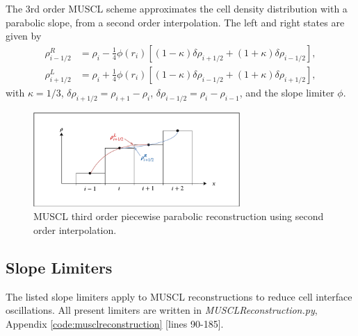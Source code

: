 	The 3rd order MUSCL scheme approximates the cell density distribution with a parabolic slope, from a second order interpolation. The left and right states are given by
	\begin{align}
		\rho^{R}_{i-1/2}&=\rho_{i}-\frac{1}{4}\phi\left(r_{i}\right)\left[\left(1-\kappa\right)\delta\rho_{i+1/2}+\left(1+\kappa\right)\delta\rho_{i-1/2}\right],\\
		\rho^{L}_{i+1/2}&=\rho_{i}+\frac{1}{4}\phi\left(r_{i}\right)\left[\left(1-\kappa\right)\delta\rho_{i-1/2}+\left(1+\kappa\right)\delta\rho_{i+1/2}\right],
	\end{align}
	with $\kappa=1/3$, $\delta\rho_{i+1/2}=\rho_{i+1}-\rho_{i}$, $\delta\rho_{i-1/2}=\rho_{i}-\rho_{i-1}$, and the slope limiter $\phi$.
	
	\begin{figure}
    		\centering
        		\includegraphics[trim=40 30 40 30,clip,width=0.7\textwidth]{MUSCL_para.pdf}
		\caption[MUSCL Reconstruction : Parabolic $3^{rd}$ order]{MUSCL third order piecewise parabolic reconstruction using second order interpolation.}
		\label{fig:app:muscl_para}
	\end{figure}
	
\subsection{Slope Limiters}
\label{ap:MUSCLslopelim}

	The listed slope limiters apply to MUSCL reconstructions to reduce cell interface oscillations. All present limiters are written in \emph{MUSCLReconstruction.py}, Appendix  \ref{code:musclreconstruction} [lines 90-185].
	

